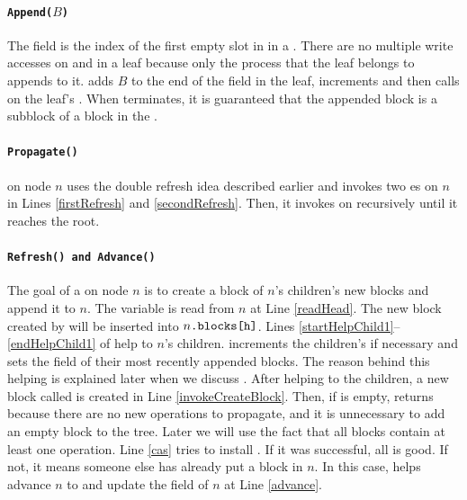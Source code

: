 \paragraph{\tt{Append($B$)}}
The  field is the index of the first empty slot in
 in a . There are no multiple write accesses
on  and  in a leaf because only the process that
the leaf belongs to appends to it.  adds $B$ to the
end of the  field in the leaf, increments  and
then calls  on the leaf's . When
 terminates, it is guaranteed that the appended block is
a subblock of a block in the .  

\paragraph{\tt{Propagate()}}
 on node $n$ uses the double refresh idea described
earlier and invokes two es on $n$ in Lines
\ref{firstRefresh} and \ref{secondRefresh}. Then, it invokes
 on  recursively until it reaches the
root.  

\paragraph{\tt{Refresh()} and \tt{Advance()}}
The goal of a  on node $n$ is to create a block of $n$'s
children's new blocks and append it to $n$. The variable
 is read from $n$ at Line \ref{readHead}. The new
block created by  will be inserted into
$n{\normalfont{\texttt{.blocks[h]}}}$. Lines \ref{startHelpChild1}--\ref{endHelpChild1}
of  help to  $n$'s children. 
increments the children's  if necessary and sets the
 field of their most recently appended blocks. The reason
behind this helping is explained later when we discuss
. After helping to  the children, a new
block called  is created in Line
\ref{invokeCreateBlock}. Then, if  is empty, 
returns  because there are no new operations to propagate,
and it is unnecessary to add an empty block to the tree. Later we will
use the fact that all blocks contain at least one operation. Line
\ref{cas} tries to install . If it was successful, all is
good. If not, it means someone else has already put a block in
$n$. In this case,  helps advance
$n$ to  and update the  field of
$n$ at Line \ref{advance}. 


